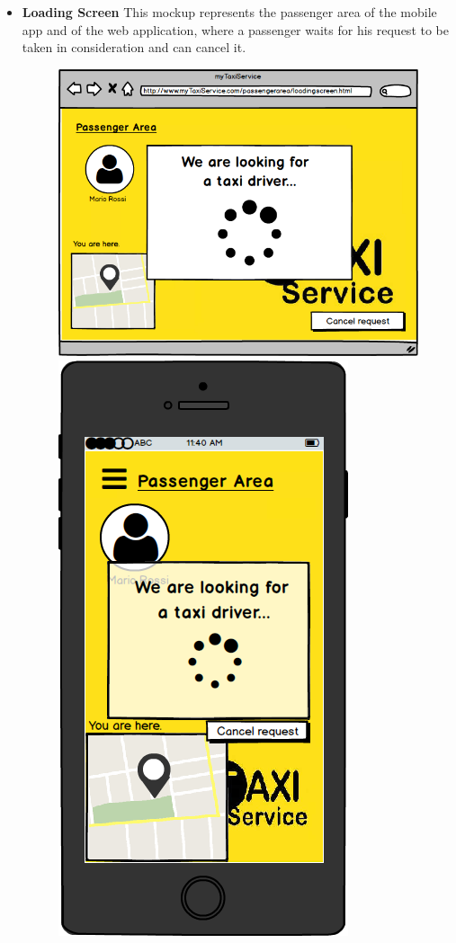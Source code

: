 \documentclass[18pt,oneside,a4paper, titlepage]{article}
\begin{document}
\begin{itemize}
\begin{figure}[h]
				\end{figure}
				\\
				\item \textbf{Loading Screen} This mockup represents the passenger area of the mobile app and of the web application, where a passenger waits for his request to be taken in consideration and can cancel it.\\
				\begin{figure}[h]
					\includegraphics[scale=0.3]{WebAppWaitForTaxi.png}%
					\qquad\qquad
					\includegraphics[scale=0.3]{MobileAppWaitForTaxi.png}

\end{figure}
\end{itemize}
\end{document}
